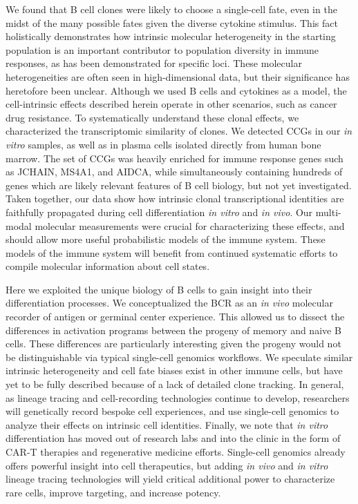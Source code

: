 We found that B cell clones were likely to choose a single-cell fate, even in the midst of the many possible fates given the diverse cytokine stimulus. This fact holistically demonstrates how intrinsic molecular heterogeneity in the starting population is an important contributor to population diversity in immune responses, as has been demonstrated for specific loci\cite{wu_intrinsic_2017}. These molecular heterogeneities are often seen in high-dimensional data, but their significance has heretofore been unclear. Although we used B cells and cytokines as a model, the cell-intrinsic effects described herein operate in other scenarios, such as cancer drug resistance\cite{goyal_pre-determined_2021}. To systematically understand these clonal effects, we characterized the transcriptomic similarity of clones. We detected CCGs in our \textit{in vitro} samples, as well as in plasma cells isolated directly from human bone marrow. The set of CCGs was heavily enriched for immune response genes such as JCHAIN, MS4A1, and AIDCA, while simultaneously containing hundreds of genes which are likely relevant features of B cell biology, but not yet investigated. Taken together, our data show how intrinsic clonal transcriptional identities are faithfully propagated during cell differentiation \textit{in vitro} and \textit{in vivo}. Our multi-modal molecular measurements were crucial for characterizing these effects, and should allow more useful probabilistic models of the immune system\cite{hodgkin_modifying_2018}. These models of the immune system will benefit from continued systematic efforts to compile molecular information about cell states\cite{tabula_sapiens_consortium_tabula_2022}.

Here we exploited the unique biology of B cells to gain insight into their differentiation processes. We conceptualized the BCR as an \textit{in vivo} molecular recorder of antigen or germinal center experience. This allowed us to dissect the differences in activation programs between the progeny of memory and naive B cells. These differences are particularly interesting given the progeny would not be distinguishable via typical single-cell genomics workflows. We speculate similar intrinsic heterogeneity and cell fate biases exist in other immune cells\cite{sanmiguel_hand_2020}, but have yet to be fully described because of a lack of detailed clone tracking. In general, as lineage tracing and cell-recording technologies continue to develop, researchers will genetically record bespoke cell experiences, and use single-cell genomics to analyze their effects on intrinsic cell identities\cite{chen_connecting_2022}. Finally, we note that \textit{in vitro} differentiation has moved out of research labs and into the clinic in the form of CAR-T therapies and regenerative medicine efforts. Single-cell genomics already offers powerful insight into cell therapeutics\cite{bode_exploiting_2021}, but adding \textit{in vivo} and \textit{in vitro} lineage tracing technologies will yield critical additional power to characterize rare cells, improve targeting, and increase potency.


